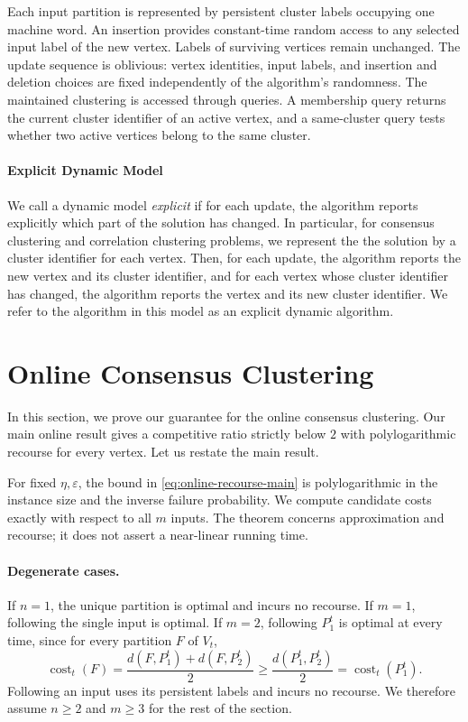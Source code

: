 \documentclass[11pt]{article}
\theoremstyle{definition}
\theoremstyle{remark}
\newcommand{\cost}{\operatorname{cost}}
\newcommand{\eps}{\varepsilon}
\newcommand{\1}{\mathbf{1}}
\begin{document}
Each input partition is represented by persistent cluster
labels occupying one machine word. An insertion provides
constant-time random access to any selected input label of
the new vertex. Labels of surviving vertices remain unchanged.
The update sequence is oblivious: vertex identities, input
labels, and insertion and deletion choices are fixed
independently of the algorithm's randomness. The maintained clustering is accessed through queries.
A membership query returns the current cluster identifier
of an active vertex, and a same-cluster query tests whether
two active vertices belong to the same cluster.

\paragraph{Explicit Dynamic Model}\label{par:explicit_dynamic_model} %
We call a dynamic model \emph{explicit} if for each update, the algorithm reports explicitly which part of the solution has changed.
In particular, for consensus clustering and correlation clustering problems, we represent the the solution by a cluster identifier for each vertex. 
Then, for each update, the algorithm reports the new vertex and its cluster identifier, and for each vertex whose cluster identifier has changed, the algorithm reports the vertex and its new cluster identifier.
We refer to the algorithm in this model as an explicit dynamic algorithm.

\section{Online Consensus Clustering}\label{sec:online}
In this section, we prove our guarantee for the online consensus clustering. Our main online result gives a competitive ratio strictly below $2$ with polylogarithmic recourse for every vertex. Let us restate the main result.


\OnlineMain*

For fixed $\eta, \eps$, the bound in
\eqref{eq:online-recourse-main} is polylogarithmic in the instance size
and the inverse failure probability. We compute candidate costs exactly
with respect to all $m$ inputs. The theorem concerns approximation and
recourse; it does not assert a near-linear running time.

\paragraph{Degenerate cases.}
If $n=1$, the unique partition is optimal and incurs no recourse.
If $m=1$, following the single input is optimal.
If $m=2$, following $P_1^t$ is optimal at every time, since for every
partition $F$ of $V_t$,
\[
  \cost_t(F)
  =\frac{d(F,P_1^t)+d(F,P_2^t)}2
  \ge\frac{d(P_1^t,P_2^t)}2
  =\cost_t(P_1^t).
\]
Following an input uses its persistent labels and incurs no recourse.
We therefore assume $n\ge2$ and $m\ge3$ for the rest of the section.
\end{document}

